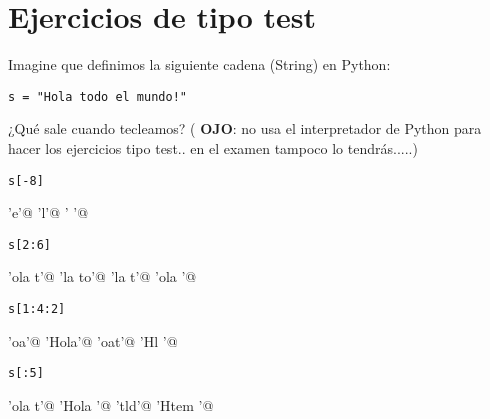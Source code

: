 \section*{Ejercicios de tipo test}


Imagine que definimos la siguiente cadena (String) en Python:

\begin{Verbatim}
s = "Hola todo el mundo!"
\end{Verbatim}

\noindent ¿Qué sale cuando tecleamos? ({\color{deepred} \textbf{OJO}: no usa el interpretador de Python para hacer los ejercicios tipo test.. en el examen tampoco lo tendrás.....})\\


\begin{ejercicio}
\begin{Verbatim}
s[-8]
\end{Verbatim}

\begin{choices}
    \choice \verb@'e'@
    \choice \verb@'l'@
    \choice \verb@' '@
    \choice \verb@IndexError@
\end{choices}
\end{ejercicio}

\begin{ejercicio}
\begin{Verbatim}
s[2:6]
\end{Verbatim}

\begin{choices}
    \choice \verb@'ola t'@
    \choice \verb@'la to'@
    \choice \verb@'la t'@
    \choice \verb@'ola '@
\end{choices}
\end{ejercicio}



\begin{ejercicio}
\begin{Verbatim}
s[1:4:2]
\end{Verbatim}

\begin{choices}
    \choice \verb@'oa'@
    \choice \verb@'Hola'@
    \choice \verb@'oat'@
    \choice \verb@'Hl '@
\end{choices}
\end{ejercicio}


\begin{ejercicio}
\begin{Verbatim}
s[:5]
\end{Verbatim}

\begin{choices}
    \choice \verb@'ola t'@
    \choice \verb@'Hola '@
    \choice \verb@'tld'@
    \choice \verb@'Htem '@
\end{choices}
\end{ejercicio}

